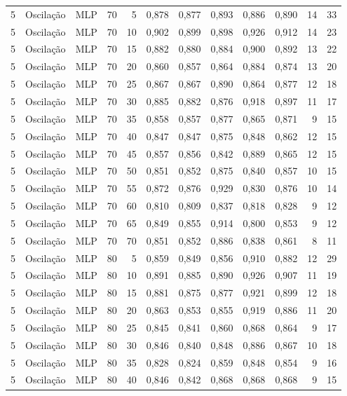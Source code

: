 \begin{longtable}{@{}rllrrrrrrrrr@{}}
5 & Oscilação & MLP & 70 & 5 & 0,878 & 0,877 & 0,893 & 0,886 & 0,890 & 14 & 33 \\
5 & Oscilação & MLP & 70 & 10 & 0,902 & 0,899 & 0,898 & 0,926 & 0,912 & 14 & 23 \\
5 & Oscilação & MLP & 70 & 15 & 0,882 & 0,880 & 0,884 & 0,900 & 0,892 & 13 & 22 \\
5 & Oscilação & MLP & 70 & 20 & 0,860 & 0,857 & 0,864 & 0,884 & 0,874 & 13 & 20 \\
5 & Oscilação & MLP & 70 & 25 & 0,867 & 0,867 & 0,890 & 0,864 & 0,877 & 12 & 18 \\
5 & Oscilação & MLP & 70 & 30 & 0,885 & 0,882 & 0,876 & 0,918 & 0,897 & 11 & 17 \\
5 & Oscilação & MLP & 70 & 35 & 0,858 & 0,857 & 0,877 & 0,865 & 0,871 & 9 & 15 \\
5 & Oscilação & MLP & 70 & 40 & 0,847 & 0,847 & 0,875 & 0,848 & 0,862 & 12 & 15 \\
5 & Oscilação & MLP & 70 & 45 & 0,857 & 0,856 & 0,842 & 0,889 & 0,865 & 12 & 15 \\
5 & Oscilação & MLP & 70 & 50 & 0,851 & 0,852 & 0,875 & 0,840 & 0,857 & 10 & 15 \\
5 & Oscilação & MLP & 70 & 55 & 0,872 & 0,876 & 0,929 & 0,830 & 0,876 & 10 & 14 \\
5 & Oscilação & MLP & 70 & 60 & 0,810 & 0,809 & 0,837 & 0,818 & 0,828 & 9 & 12 \\
5 & Oscilação & MLP & 70 & 65 & 0,849 & 0,855 & 0,914 & 0,800 & 0,853 & 9 & 12 \\
5 & Oscilação & MLP & 70 & 70 & 0,851 & 0,852 & 0,886 & 0,838 & 0,861 & 8 & 11 \\
5 & Oscilação & MLP & 80 & 5 & 0,859 & 0,849 & 0,856 & 0,910 & 0,882 & 12 & 29 \\
5 & Oscilação & MLP & 80 & 10 & 0,891 & 0,885 & 0,890 & 0,926 & 0,907 & 11 & 19 \\
5 & Oscilação & MLP & 80 & 15 & 0,881 & 0,875 & 0,877 & 0,921 & 0,899 & 12 & 18 \\
5 & Oscilação & MLP & 80 & 20 & 0,863 & 0,853 & 0,855 & 0,919 & 0,886 & 11 & 20 \\
5 & Oscilação & MLP & 80 & 25 & 0,845 & 0,841 & 0,860 & 0,868 & 0,864 & 9 & 17 \\
5 & Oscilação & MLP & 80 & 30 & 0,846 & 0,840 & 0,848 & 0,886 & 0,867 & 10 & 18 \\
5 & Oscilação & MLP & 80 & 35 & 0,828 & 0,824 & 0,859 & 0,848 & 0,854 & 9 & 16 \\
5 & Oscilação & MLP & 80 & 40 & 0,846 & 0,842 & 0,868 & 0,868 & 0,868 & 9 & 15 \\

\end{longtable}
